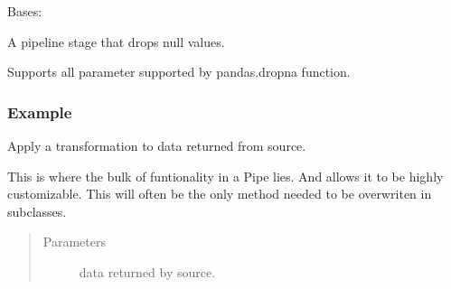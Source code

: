\documentclass[letterpaper,10pt,english]{sphinxmanual}
\begin{document}
\begin{fulllineitems}
\label{\detokenize{dalio.pipe:dalio.pipe.select.DropNa}}
Bases: {\hyperref[\detokenize{dalio.pipe:dalio.pipe.pipe.Pipe}]{}}

A pipeline stage that drops null values.

Supports all parameter supported by pandas.dropna function.
\subsubsection*{Example}

\begin{sphinxVerbatim}[commandchars=\\\{\}]
       
  \PYG{p}{[}\PYG{p}{[}\PYG{p}{]}\PYG{p}{[}\PYG{p}{]}\PYG{p}{[}\PYG{p}{]}\PYG{p}{]} \PYG{p}{[}\PYG{p}{]} \PYG{p}{[}\PYG{p}{]}
\end{sphinxVerbatim}

\begin{fulllineitems}
\label{\detokenize{dalio.pipe:dalio.pipe.select.DropNa.transform}}
Apply a transformation to data returned from source.

This is where the bulk of funtionality in a Pipe lies. And allows it
to be highly customizable. This will often be the only method needed
to be overwriten in subclasses.
\begin{quote}\begin{description}
\item[{Parameters}] \leavevmode
{} \textendash{} data returned by source.

\end{description}\end{quote}

\end{fulllineitems}


\end{fulllineitems}
\end{document}
